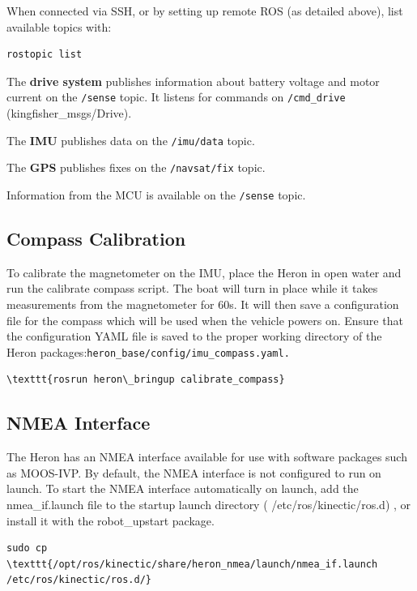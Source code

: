 \documentclass[]{clearpath-latex/clearpath-manual}
\begin{document}
When connected via SSH, or by setting up remote ROS (as detailed above), list available topics with:

\begin{lstlisting}
rostopic list
\end{lstlisting}

The \textbf{drive system} publishes information about battery voltage and motor current on the \lstinline{/sense} topic. It listens for commands on \lstinline{/cmd_drive} (kingfisher\_msgs/Drive).

The \textbf{IMU} publishes data on the \lstinline{/imu/data} topic.

The \textbf{GPS} publishes fixes on the \lstinline{/navsat/fix} topic.

Information from the MCU is available on the \lstinline{/sense} topic.

\subsection{Compass Calibration}

To calibrate the magnetometer on the IMU, place the Heron in open water and run the calibrate compass script. The boat will turn in place while it takes measurements from the magnetometer for 60s. It will then save a configuration file for the compass which will be used when the vehicle powers on. Ensure that the configuration YAML file is saved to the proper working directory of the Heron packages:\texttt{heron\_base/config/imu\_compass.yaml.}

\begin{lstlisting}
\texttt{rosrun heron\_bringup calibrate_compass}
\end{lstlisting}

\subsection{NMEA Interface}

The Heron has an NMEA interface available for use with software packages such as MOOS-IVP. By default, the NMEA interface is not configured to run on launch. To start the NMEA interface automatically on launch, add the nmea\_if.launch file to the startup launch directory ( /etc/ros/kinectic/ros.d) , or install it with the robot\_upstart package. 
\begin{lstlisting}
sudo cp \texttt{/opt/ros/kinectic/share/heron_nmea/launch/nmea_if.launch /etc/ros/kinectic/ros.d/}
\end{lstlisting}
\end{document}
